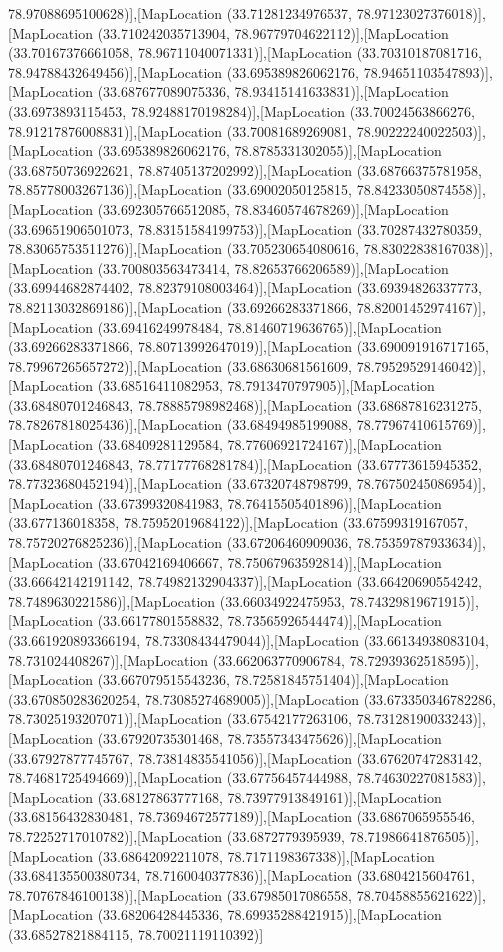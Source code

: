 78.97088695100628)],[MapLocation (33.71281234976537, 78.97123027376018)],[MapLocation (33.710242035713904, 78.96779704622112)],[MapLocation (33.70167376661058, 78.96711040071331)],[MapLocation (33.70310187081716, 78.94788432649456)],[MapLocation (33.695389826062176, 78.94651103547893)],[MapLocation (33.687677089075336, 78.93415141633831)],[MapLocation (33.6973893115453, 78.92488170198284)],[MapLocation (33.70024563866276, 78.91217876008831)],[MapLocation (33.70081689269081, 78.90222240022503)],[MapLocation (33.695389826062176, 78.8785331302055)],[MapLocation (33.68750736922621, 78.87405137202992)],[MapLocation (33.68766375781958, 78.85778003267136)],[MapLocation (33.69002050125815, 78.84233050874558)],[MapLocation (33.692305766512085, 78.83460574678269)],[MapLocation (33.69651906501073, 78.83151584199753)],[MapLocation (33.70287432780359, 78.83065753511276)],[MapLocation (33.705230654080616, 78.83022838167038)],[MapLocation (33.700803563473414, 78.82653766206589)],[MapLocation (33.69944682874402, 78.82379108003464)],[MapLocation (33.69394826337773, 78.82113032869186)],[MapLocation (33.69266283371866, 78.82001452974167)],[MapLocation (33.69416249978484, 78.81460719636765)],[MapLocation (33.69266283371866, 78.80713992647019)],[MapLocation (33.690091916717165, 78.79967265657272)],[MapLocation (33.68630681561609, 78.79529529146042)],[MapLocation (33.68516411082953, 78.7913470797905)],[MapLocation (33.68480701246843, 78.78885798982468)],[MapLocation (33.68687816231275, 78.78267818025436)],[MapLocation (33.68494985199088, 78.77967410615769)],[MapLocation (33.68409281129584, 78.77606921724167)],[MapLocation (33.68480701246843, 78.77177768281784)],[MapLocation (33.67773615945352, 78.77323680452194)],[MapLocation (33.67320748798799, 78.76750245086954)],[MapLocation (33.67399320841983, 78.76415505401896)],[MapLocation (33.677136018358, 78.75952019684122)],[MapLocation (33.67599319167057, 78.75720276825236)],[MapLocation (33.67206460909036, 78.75359787933634)],[MapLocation (33.67042169406667, 78.75067963592814)],[MapLocation (33.66642142191142, 78.74982132904337)],[MapLocation (33.66420690554242, 78.7489630221586)],[MapLocation (33.66034922475953, 78.74329819671915)],[MapLocation (33.66177801558832, 78.73565926544474)],[MapLocation (33.661920893366194, 78.73308434479044)],[MapLocation (33.66134938083104, 78.731024408267)],[MapLocation (33.662063770906784, 78.72939362518595)],[MapLocation (33.667079515543236, 78.72581845751404)],[MapLocation (33.670850283620254, 78.73085274689005)],[MapLocation (33.673350346782286, 78.73025193207071)],[MapLocation (33.67542177263106, 78.73128190033243)],[MapLocation (33.67920735301468, 78.73557343475626)],[MapLocation (33.67927877745767, 78.73814835541056)],[MapLocation (33.67620747283142, 78.74681725494669)],[MapLocation (33.67756457444988, 78.74630227081583)],[MapLocation (33.68127863777168, 78.73977913849161)],[MapLocation (33.68156432830481, 78.73694672577189)],[MapLocation (33.6867065955546, 78.72252717010782)],[MapLocation (33.6872779395939, 78.71986641876505)],[MapLocation (33.68642092211078, 78.7171198367338)],[MapLocation (33.684135500380734, 78.7160040377836)],[MapLocation (33.6804215604761, 78.70767846100138)],[MapLocation (33.67985017086558, 78.70458855621622)],[MapLocation (33.68206428445336, 78.69935288421915)],[MapLocation (33.68527821884115, 78.70021119110392)]